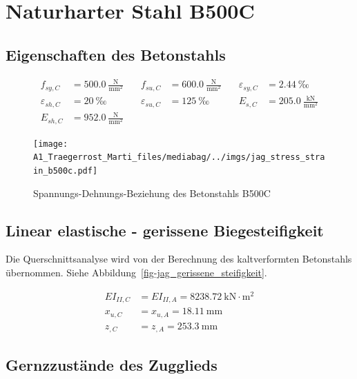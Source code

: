 \documentclass[
  11pt,
  letterpaper,
]{scrreprt}
\begin{document}
\section{Naturharter Stahl B500C}\label{naturharter-stahl-b500c}

\subsection{Eigenschaften des
Betonstahls}\label{eigenschaften-des-betonstahls-1}

\[
\begin{aligned}
f_{sy , C}& = 500.0 \ \frac{\mathrm{N}}{\mathrm{mm}^{2}} \quad & f_{su , C}& = 600.0 \ \frac{\mathrm{N}}{\mathrm{mm}^{2}} \quad & \varepsilon_{sy , C}& = 2.44 \ \mathrm{‰} \\ 
\varepsilon_{sh , C}& = 20 \ \mathrm{‰} \quad & \varepsilon_{su , C}& = 125 \ \mathrm{‰} \quad & E_{s , C}& = 205.0 \ \frac{\mathrm{kN}}{\mathrm{mm}^{2}} \\ 
E_{sh , C}& = 952.0 \ \frac{\mathrm{N}}{\mathrm{mm}^{2}} \quad &  \quad &  
 \end{aligned}
\]

\begin{figure}[H]

{\centering \texttt{[image: A1\_Traegerrost\_Marti\_files/mediabag/../imgs/jag\_stress\_strain\_b500c.pdf]}

}

\caption{Spannungs-Dehnungs-Beziehung des Betonstahls B500C}

\end{figure}%

\subsection{Linear elastische - gerissene
Biegesteifigkeit}\label{linear-elastische---gerissene-biegesteifigkeit-1}

Die Querschnittsanalyse wird von der Berechnung des kaltverformten
Betonstahls übernommen. Siehe
Abbildung~\ref{fig-jag_gerissene_steifigkeit}.

\[
\begin{aligned}
EI_{II , C}& = EI_{II , A} = 8238.72 \ \mathrm{kN} \cdot \mathrm{m}^{2} \\ 
x_{u , C}& = x_{u , A} = 18.11 \ \mathrm{mm} \\ 
z_{, C}& = z_{, A} = 253.3 \ \mathrm{mm} \end{aligned}
\]

\subsection{Gernzzustände des
Zugglieds}\label{gernzzustuxe4nde-des-zugglieds}
\end{document}
